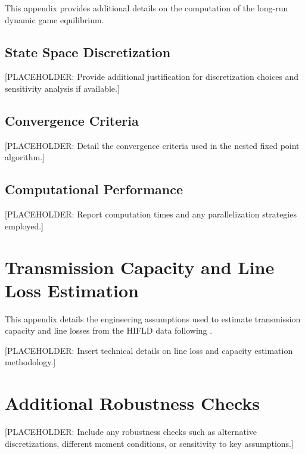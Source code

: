 \documentclass[12pt]{article}
\begin{document}
This appendix provides additional details on the computation of the long-run dynamic game equilibrium.

\subsection{State Space Discretization}

[PLACEHOLDER: Provide additional justification for discretization choices and sensitivity analysis if available.]

\subsection{Convergence Criteria}

[PLACEHOLDER: Detail the convergence criteria used in the nested fixed point algorithm.]

\subsection{Computational Performance}

[PLACEHOLDER: Report computation times and any parallelization strategies employed.]

\section{Transmission Capacity and Line Loss Estimation} \label{sec:appendixc}

This appendix details the engineering assumptions used to estimate transmission capacity and line losses from the HIFLD data following \cite{arkolakis2023clean}.

[PLACEHOLDER: Insert technical details on line loss and capacity estimation methodology.]

\section{Additional Robustness Checks} \label{sec:appendixd}

[PLACEHOLDER: Include any robustness checks such as alternative discretizations, different moment conditions, or sensitivity to key assumptions.]
\end{document}
